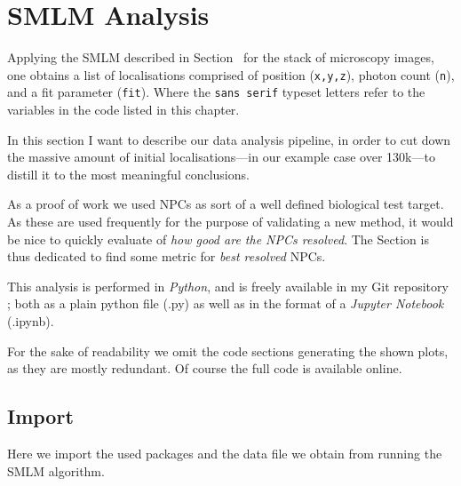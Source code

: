 \documentclass[11pt, a4paper, oneside, twocolumn]{report}
\renewcommand{\tt}{\texttt}
\renewcommand{\t}{\todo}
\newcommand{\e}{\emph}
\begin{document}
\clearpage\section{SMLM Analysis}\label{s:r:ana}

Applying the SMLM described in Section~\t{sec} for the stack of
microscopy images, one obtains a list of localisations comprised of
position (\tt{x,y,z}), photon count (\tt{n}), and a fit parameter
(\tt{fit}). Where the \tt{sans serif} typeset letters refer to the
variables in the code listed in this chapter.

In this section I want to describe our data analysis pipeline, in
order to cut down the massive amount of initial localisations---in our
example case over 130k---to distill it to the most meaningful
conclusions.

As a proof of work we used NPCs as sort of a well defined biological
test target. As these are used frequently for the purpose of
validating a new method, it would be nice to quickly evaluate of
\e{how good are the NPCs resolved}. The Section \t{sec} is thus
dedicated to find some metric for \e{best resolved} NPCs.

This analysis is performed in \e{Python}, and is freely available in
my Git repository \t{git}; both as a plain python file (.py) as well
as in the format of a \e{Jupyter Notebook} (.ipynb).

For the sake of readability we omit the code sections generating the
shown plots, as they are mostly redundant. Of course the full code is
available online.

\t{npc image}

\t{appendix}


\subsection{Import}

Here we import the used packages and the data file we obtain from
running the SMLM algorithm.

\end{document}
